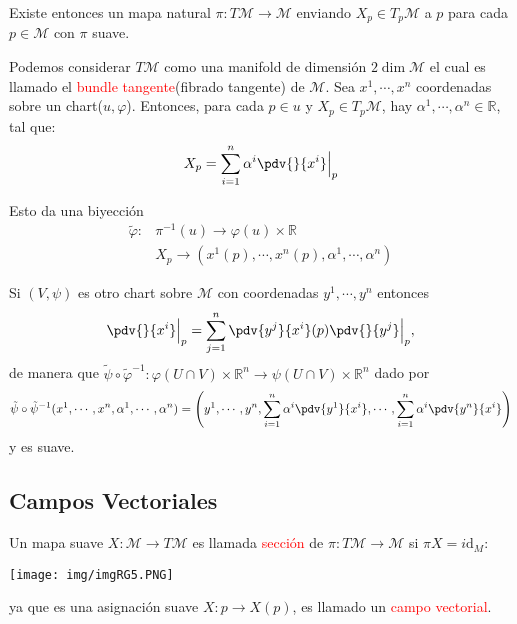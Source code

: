 \documentclass[../main]{subfiles}
\begin{document}
Existe entonces un mapa natural $\pi: T\mathcal{M}\rightarrow \mathcal{M}$ enviando $X_p \in T_p \mathcal{M}$ a $p$ para cada $p\in \mathcal{M}$ con $\pi$ suave.

Podemos considerar $T\mathcal{M}$ como una manifold de dimensión $2\dim \mathcal{M}$ el cual es llamado el \textcolor{red}{bundle tangente}(fibrado tangente) de $\mathcal{M}$. Sea $x^1, \cdots, x^n$ coordenadas sobre un chart($u, \varphi$). Entonces, para cada $p\in u$ y $X_p \in T_p \mathcal{M}$, hay $\alpha^1, \cdots, \alpha^n \in \mathbb{R}$, tal que:
\begin{equation}
    X_p=\sum_{i=1}^n \alpha^{i} \pdv{}{x^{i}}\Big{|}_p
\end{equation}

Esto da una biyección 
\begin{equation}
    \begin{split}
        \tilde{\varphi}: &\pi^{-1}(u)\rightarrow \varphi(u)\times \mathbb{R}\\
        &X_p \rightarrow (x^1(p), \cdots, x^n(p), \alpha^1, \cdots, \alpha^n)
    \end{split}
\end{equation}

Si $(V, \psi)$ es otro chart sobre $\mathcal{M}$ con coordenadas $y^1, \cdots, y^n$ entonces 
\begin{equation}
    \pdv{}{x^{i}}\Big{|}_p=\sum_{j=1}^n \pdv{y^j}{x^{i}}(p)\pdv{}{y^j}\Big{|}_p,
\end{equation}
de manera que $\tilde{\psi} \circ \tilde{\varphi}^{-1}: \varphi(U \cap V)\times \mathbb{R}^n \rightarrow \psi(U \cap V) \times \mathbb{R}^n$ dado por 
\begin{equation}
    \tilde{\psi}\circ \tilde{\psi}^{-1}(x^1, \cdots, x^n, \alpha^1, \cdots, \alpha^n)=\left(y^1, \cdots, y^n, \sum_{i=1}^n \alpha^{i}\pdv{y^1}{x^{i}}, \cdots, \sum_{i=1}^n \alpha^{i}\pdv{y^n}{x^{i}}\right)
\end{equation}
y es suave.

\subsection{Campos Vectoriales}
Un mapa suave $X: \mathcal{M} \rightarrow T\mathcal{M}$ es llamada \textcolor{red}{sección} de $\pi: T \mathcal{M}\rightarrow \mathcal{M}$ si $\pi X=i\mathrm{d}_M$:
\begin{center}
    \texttt{[image: img/imgRG5.PNG]}
\end{center}
ya que es una asignación suave $X:p\rightarrow X(p)$, es llamado un \textcolor{red}{campo vectorial}.
\end{document}
